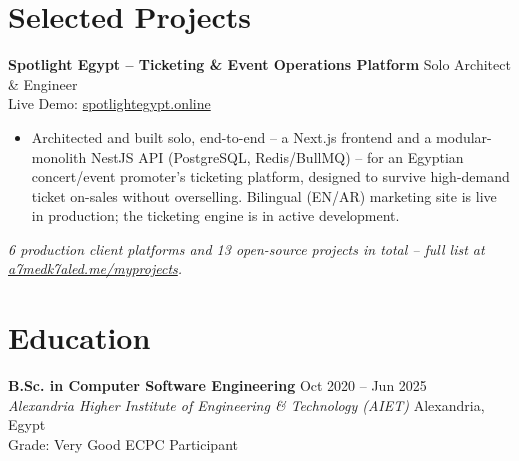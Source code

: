 \documentclass[10pt,letterpaper]{article}
\newcommand{\sectionrule}{\vspace{-1pt}{\color{hairline}\hrule height 0.6pt}\vspace{2pt}}
\newcommand{\entryHeading}[4]{%
  \textbf{#1} \hfill {\small\color{muted}#2}\\
  {\small\color{muted}\textit{#3}} \hfill {\small\color{muted}#4}\\[0pt]
}
\newcommand{\lineHeading}[2]{%
  \textbf{#1} \hfill {\small\color{muted}#2}\\[0pt]
}
\newcommand{\linkLine}[3]{{\footnotesize\color{muted}#1: }{\footnotesize\href{#2}{#3}}\\[0pt]}
\newcommand{\sectionNote}[1]{{\footnotesize\color{muted}\itshape#1}}
\begin{document}
\section*{Selected Projects}
\sectionrule
\lineHeading{Spotlight Egypt -- Ticketing \& Event Operations Platform}{Solo Architect \& Engineer}
\linkLine{Live Demo}{https://spotlightegypt.online/}{spotlightegypt.online}
{\small
\begin{itemize}
    \item Architected and built solo, end-to-end -- a Next.js frontend and a modular-monolith NestJS API
    (PostgreSQL, Redis/BullMQ) -- for an Egyptian concert/event promoter's ticketing platform, designed to
    survive high-demand ticket on-sales without overselling. Bilingual (EN/AR) marketing site is live in
    production; the ticketing engine is in active development.
\end{itemize}
}

\vspace{1pt}
\sectionNote{6 production client platforms and 13 open-source projects in total -- full list at
\href{https://a7medk7aled.me/myprojects}{a7medk7aled.me/myprojects}.}

\section*{Education}
\sectionrule
\entryHeading{B.Sc. in Computer Software Engineering}{Oct 2020 -- Jun 2025}{Alexandria Higher Institute of Engineering \& Technology (AIET)}{Alexandria, Egypt}
{\small Grade: Very Good \quad\textperiodcentered\quad ECPC Participant}
\end{document}
